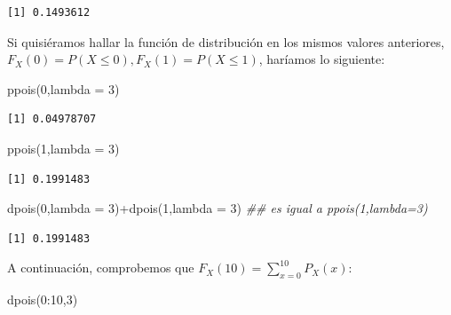 \documentclass[
  letterpaper,
  DIV=11,
  numbers=noendperiod]{scrreprt}
\newenvironment{Shaded}{\begin{snugshade}}{\end{snugshade}}
\newcommand{\AttributeTok}[1]{\textcolor[rgb]{0.40,0.45,0.13}{#1}}
\newcommand{\DecValTok}[1]{\textcolor[rgb]{0.68,0.00,0.00}{#1}}
\newcommand{\DocumentationTok}[1]{\textcolor[rgb]{0.37,0.37,0.37}{\textit{#1}}}
\newcommand{\FunctionTok}[1]{\textcolor[rgb]{0.28,0.35,0.67}{#1}}
\newcommand{\NormalTok}[1]{\textcolor[rgb]{0.00,0.23,0.31}{#1}}
\newcommand{\SpecialCharTok}[1]{\textcolor[rgb]{0.37,0.37,0.37}{#1}}
\begin{document}
\begin{verbatim}
[1] 0.1493612
\end{verbatim}

Si quisiéramos hallar la función de distribución en los mismos valores
anteriores, \(F_X(0)=P(X\leq 0), F_X(1)=P(X\leq 1)\), haríamos lo
siguiente:

\begin{Shaded}
\begin{Highlighting}[]
\FunctionTok{ppois}\NormalTok{(}\DecValTok{0}\NormalTok{,}\AttributeTok{lambda =} \DecValTok{3}\NormalTok{)}
\end{Highlighting}
\end{Shaded}

\begin{verbatim}
[1] 0.04978707
\end{verbatim}

\begin{Shaded}
\begin{Highlighting}[]
\FunctionTok{ppois}\NormalTok{(}\DecValTok{1}\NormalTok{,}\AttributeTok{lambda =} \DecValTok{3}\NormalTok{)}
\end{Highlighting}
\end{Shaded}

\begin{verbatim}
[1] 0.1991483
\end{verbatim}

\begin{Shaded}
\begin{Highlighting}[]
\FunctionTok{dpois}\NormalTok{(}\DecValTok{0}\NormalTok{,}\AttributeTok{lambda =} \DecValTok{3}\NormalTok{)}\SpecialCharTok{+}\FunctionTok{dpois}\NormalTok{(}\DecValTok{1}\NormalTok{,}\AttributeTok{lambda =} \DecValTok{3}\NormalTok{) }\DocumentationTok{\#\# es igual a ppois(1,lambda=3)}
\end{Highlighting}
\end{Shaded}

\begin{verbatim}
[1] 0.1991483
\end{verbatim}

A continuación, comprobemos que
\(F_X(10)=\sum\limits_{x=0}^{10} P_X(x)\):

\begin{Shaded}
\begin{Highlighting}[]
\FunctionTok{dpois}\NormalTok{(}\DecValTok{0}\SpecialCharTok{:}\DecValTok{10}\NormalTok{,}\DecValTok{3}\NormalTok{)}
\end{Highlighting}
\end{Shaded}
\end{document}
